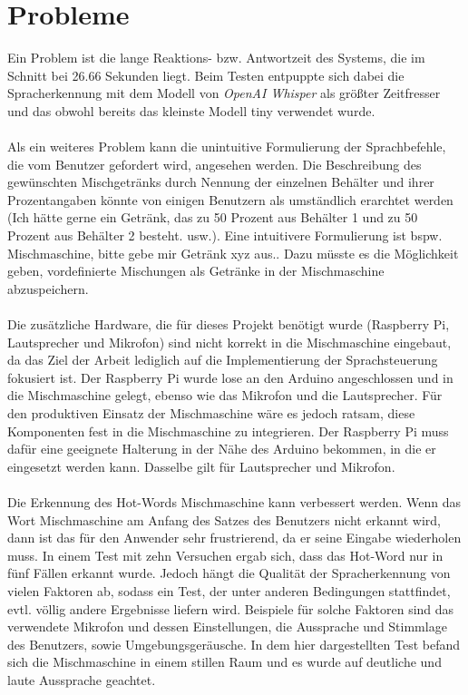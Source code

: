 \section{Probleme}
Ein Problem ist die lange Reaktions- bzw. Antwortzeit des Systems, die im Schnitt bei 26.66 Sekunden liegt. Beim Testen entpuppte sich dabei die Spracherkennung mit dem Modell von \textit{OpenAI Whisper} als größter Zeitfresser und das obwohl bereits das kleinste Modell \glqq{}tiny\grqq{} verwendet wurde.\\\\
Als ein weiteres Problem kann die unintuitive Formulierung der Sprachbefehle, die vom Benutzer gefordert wird, angesehen werden. Die Beschreibung des gewünschten Mischgetränks durch Nennung der einzelnen Behälter und ihrer Prozentangaben könnte von einigen Benutzern als umständlich erarchtet werden (\glqq{}Ich hätte gerne ein Getränk, das zu 50 Prozent aus Behälter 1 und zu 50 Prozent aus Behälter 2 besteht.\grqq{} usw.). Eine intuitivere Formulierung ist bspw. \glqq{}Mischmaschine, bitte gebe mir Getränk xyz aus.\grqq{}. Dazu müsste es die Möglichkeit geben, vordefinierte Mischungen als Getränke in der Mischmaschine abzuspeichern.\\\\
Die zusätzliche Hardware, die für dieses Projekt benötigt wurde (Raspberry Pi, Lautsprecher und Mikrofon) sind nicht korrekt in die Mischmaschine eingebaut, da das Ziel der Arbeit lediglich auf die Implementierung der Sprachsteuerung fokusiert ist. Der Raspberry Pi wurde \glqq{}lose\grqq{} an den Arduino angeschlossen und in die Mischmaschine \glqq{}gelegt\grqq{}, ebenso wie das Mikrofon und die Lautsprecher. Für den produktiven Einsatz der Mischmaschine wäre es jedoch ratsam, diese Komponenten fest in die Mischmaschine zu integrieren. Der Raspberry Pi muss dafür eine geeignete Halterung in der Nähe des Arduino bekommen, in die er eingesetzt werden kann. Dasselbe gilt für Lautsprecher und Mikrofon.\\\\
Die Erkennung des Hot-Words \glqq{}Mischmaschine\grqq{} kann verbessert werden. Wenn das Wort \glqq{}Mischmaschine\grqq{} am Anfang des Satzes des Benutzers nicht erkannt wird, dann ist das für den Anwender sehr frustrierend, da er seine Eingabe wiederholen muss. In einem Test mit zehn Versuchen ergab sich, dass das Hot-Word nur in fünf Fällen erkannt wurde. Jedoch hängt die Qualität der Spracherkennung von vielen Faktoren ab, sodass ein Test, der unter anderen Bedingungen stattfindet, evtl. völlig andere Ergebnisse liefern wird. Beispiele für solche Faktoren sind das verwendete Mikrofon und dessen Einstellungen, die Aussprache und Stimmlage des Benutzers, sowie Umgebungsgeräusche. In dem hier dargestellten Test befand sich die Mischmaschine in einem stillen Raum und es wurde auf deutliche und laute Aussprache geachtet.
